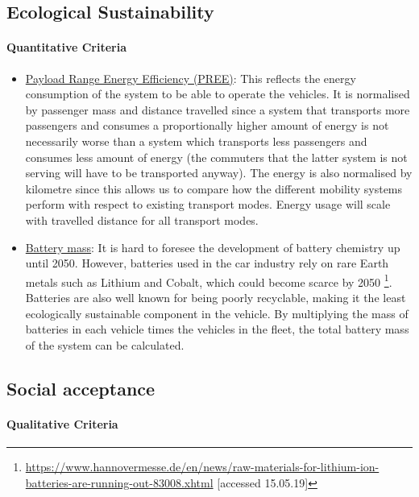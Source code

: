 \subsection{Ecological Sustainability}

\paragraph{Quantitative Criteria}

\begin{itemize}[nolistsep]
    \item \underline{Payload Range Energy Efficiency (PREE)}: This reflects the energy consumption of the system to be able to operate the vehicles. It is normalised by passenger mass and distance travelled since a system that transports more passengers and consumes a proportionally higher amount of energy is not necessarily worse than a system which transports less passengers and consumes less amount of energy (the commuters that the latter system is not serving will have to be transported anyway). The energy is also normalised by kilometre since this allows us to compare how the different mobility systems perform with respect to existing transport modes. Energy usage will scale with travelled distance for all transport modes.  %
    \item \underline{Battery mass}: It is hard to foresee the development of battery chemistry up until 2050. However, batteries used in the car industry rely on rare Earth metals such as Lithium and Cobalt, which could become scarce by 2050 \footnote{\url{https://www.hannovermesse.de/en/news/raw-materials-for-lithium-ion-batteries-are-running-out-83008.xhtml} [accessed 15.05.19]}. Batteries are also well known for being poorly recyclable, making it the least ecologically sustainable component in the vehicle. By multiplying the mass of batteries in each vehicle times the vehicles in the fleet, the total battery mass of the system can be calculated.
    
\end{itemize}

\subsection{Social acceptance}

\paragraph{Qualitative Criteria}

